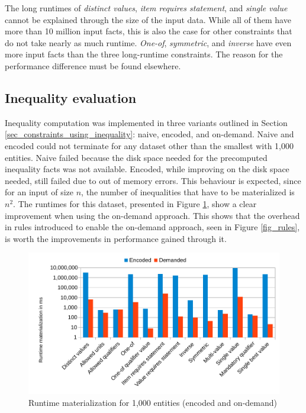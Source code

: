 \documentclass[hyperref,bachelorofscience,fleqn]{cgvpub}
\begin{document}
The long runtimes of \emph{distinct values}, \emph{item requires statement}, and \emph{single value} cannot be explained through the size of the input data. While all of them have more than 10 million input facts, this is also the case for other constraints that do not take nearly as much runtime. \emph{One-of}, \emph{symmetric}, and \emph{inverse} have even more input facts than the three long-runtime constraints. The reason for the performance difference must be found elsewhere.

\subsection{Inequality evaluation}\label{sec_inequality_evaluation}
Inequality computation was implemented in three variants outlined in Section \ref{sec_constraints_using_inequality}: naive, encoded, and on-demand. Naive and encoded could not terminate for any dataset other than the smallest with 1,000 entities. Naive failed because the disk space needed for the precomputed inequality facts was not available. Encoded, while improving on the disk space needed, still failed due to out of memory errors. This behaviour is expected, since for an input of size \(n\), the number of inequalities that have to be materialized is \(n^2\). The runtimes for this dataset, presented in Figure \ref{fig_inequality}, show a clear improvement when using the on-demand approach. This shows that the overhead in rules introduced to enable the on-demand approach, seen in Figure \ref{fig_rules}, is worth the improvements in performance gained through it.

\begin{figure}
\includegraphics[width=\linewidth]{images/inequality1000.pdf}
\caption{Runtime materialization for 1,000 entities (encoded and on-demand)}\label{fig_inequality}
\end{figure}
\end{document}
